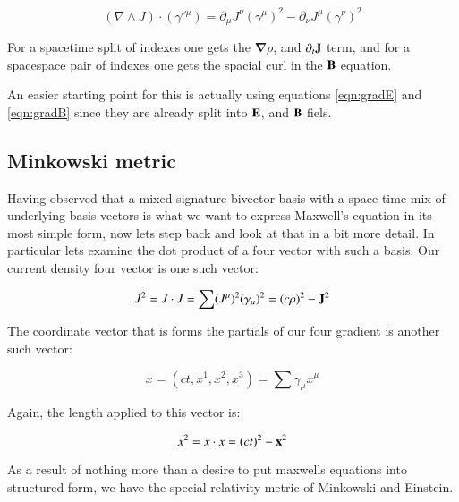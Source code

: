 \documentclass{article}
\newcommand{\spacegrad}[0]{\boldsymbol{\nabla}}
\newcommand{\grad}[0]{\nabla}
\begin{document}
\begin{equation*}
(\grad \wedge J) \cdot (\gamma^{\nu\mu}) = \partial_{\mu}J^{\nu} (\gamma^{\mu})^2 - \partial_{\nu}J^{\mu} (\gamma^{\nu})^2
\end{equation*}

For a spacetime split of indexes one gets the $\spacegrad\rho$, and $\partial_t \mathbf{J}$ term, and for a spacespace pair of indexes one gets the spacial curl in the $\mathbf{B}$ equation.

An easier starting point for this is actually using equations \ref{eqn:gradE} and \ref{eqn:gradB} since they are already split into $\mathbf{E}$, and $\mathbf{B}$ fiels.

\subsection{ Minkowski metric }

Having observed that a mixed signature bivector basis with a space time mix of underlying basis vectors is what we want to
express Maxwell's equation in its most simple form, now lets step back and look at that in a bit more detail.  In particular
lets examine the dot product of a four vector with such a basis.  Our current density four vector is one such vector:

\begin{align*}
J^2 = J \cdot J = \sum (J^{\mu})^2 (\gamma_{\mu})^2 = (c\rho)^2 - \mathbf{J}^2
\end{align*}

The coordinate vector that is forms the partials of our four gradient is another such vector:

\begin{equation*}
x = (ct, x^1, x^2, x^3) = \sum \gamma_{\mu} x^{\mu}
\end{equation*}

Again, the length applied to this vector is:

\begin{equation}
x^2 = x \cdot x = (ct)^2 - \mathbf{x}^2
\end{equation}

As a result of nothing more than a desire to put maxwells equations into structured form, we have the special relativity metric
of Minkowski and Einstein.
\end{document}
